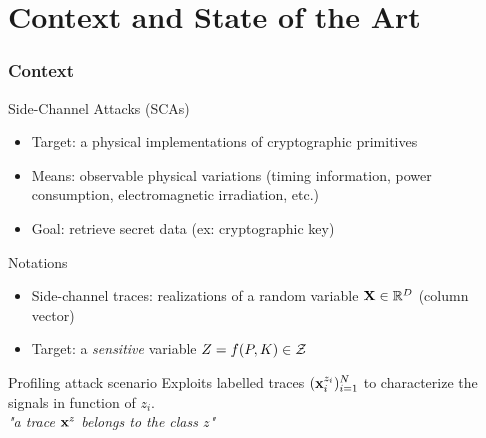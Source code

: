 \section{Context and State of the Art}

\begin{frame}
\vspace{-15pt}
\frametitle{Context}
\begin{block}{Side-Channel Attacks (SCAs)}
\begin{itemize}
\item Target: a physical implementations of cryptographic primitives 
\item Means: observable physical variations (timing information, power consumption, electromagnetic irradiation, etc.)
\item Goal: retrieve secret data (ex: cryptographic key)
\end{itemize}
\end{block}

\begin{block}{Notations}
\begin{itemize}
\item Side-channel traces: realizations of a random variable $\XXX \in \mathbb{R}^D$  (column vector)
\item Target: a \emph{sensitive} variable $Z = f(P,K)\in\sensVarSet$ 
\end{itemize}
\end{block}
\vspace{-5pt}
\begin{block}{Profiling attack scenario}
Exploits labelled traces $(\sss[z_i]{i})_{i=1}^N$ to characterize the signals in function of $z_i$.\\
\emph{"a trace $\sss[z]{}$ belongs to the class $z$"}
\end{block}



\end{frame}




